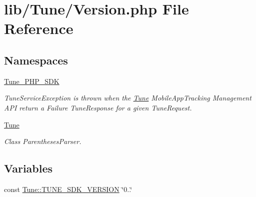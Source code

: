\hypertarget{Version_8php}{\section{lib/\-Tune/\-Version.php File Reference}
\label{Version_8php}
}
\subsection*{Namespaces}
\begin{DoxyCompactItemize}
\item 
\hyperlink{namespaceTune__PHP__SDK}{Tune\-\_\-\-P\-H\-P\-\_\-\-S\-D\-K}
\begin{DoxyCompactList}\small\item\em Tune\-Service\-Exception is thrown when the \hyperlink{namespaceTune}{Tune} Mobile\-App\-Tracking Management A\-P\-I return a Failure Tune\-Response for a given Tune\-Request. \end{DoxyCompactList}\item 
\hyperlink{namespaceTune}{Tune}
\begin{DoxyCompactList}\small\item\em Class Parentheses\-Parser. \end{DoxyCompactList}\end{DoxyCompactItemize}
\subsection*{Variables}
\begin{DoxyCompactItemize}
\item 
const \hyperlink{namespaceTune_a064a74b8093f320885e1a817c501a0cc}{Tune\-::\-T\-U\-N\-E\-\_\-\-S\-D\-K\-\_\-\-V\-E\-R\-S\-I\-O\-N} \char`\"{}0..\char`\"{}
\end{DoxyCompactItemize}
